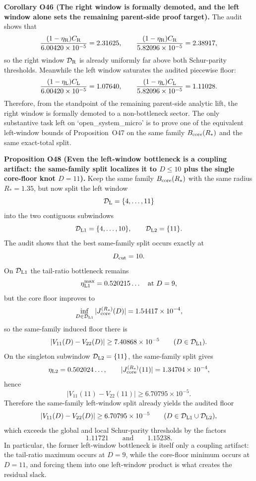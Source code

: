 \documentclass[aps,prd,onecolumn,notitlepage,nofootinbib,superscriptaddress,11pt,floatfix]{revtex4-2}
\begin{document}
\medskip\noindent\textbf{Corollary O46 (The right window is formally demoted, and the left window alone sets the remaining parent-side proof target).}
The audit
shows that
\[
\frac{(1-\eta_{\rm R})C_{\rm R}}{6.00420\times10^{-5}}=2.31625,
\qquad
\frac{(1-\eta_{\rm R})C_{\rm R}}{5.82096\times10^{-5}}=2.38917,
\]
so the right window \(\mathcal D_{\rm R}\) is already uniformly far above both Schur-parity thresholds.  Meanwhile the left window saturates the audited piecewise floor:
\[
\frac{(1-\eta_{\rm L})C_{\rm L}}{6.00420\times10^{-5}}=1.07640,
\qquad
\frac{(1-\eta_{\rm L})C_{\rm L}}{5.82096\times10^{-5}}=1.11028.
\]
Therefore, from the standpoint of the remaining parent-side analytic lift, the right window is formally demoted to a non-bottleneck sector.  The only substantive task left on `open\_system\_micro' is to prove one of the equivalent left-window bounds of Proposition~O47 on the same family \(B_{\rm core}(R_\ast)\) and the same exact-total split.

\medskip\noindent\textbf{Proposition O48 (Even the left-window bottleneck is a coupling artifact: the same-family split localizes it to \(D\le 10\) plus the single core-floor knot \(D=11\)).}
Keep the same family \(B_{\rm core}(R_\ast)\) with the same radius \(R_\ast=1.35\), but now split the left window
\[
\mathcal D_{\rm L}=\{4,\dots,11\}
\]
into the two contiguous subwindows
\[
\mathcal D_{\rm L1}=\{4,\dots,10\},
\qquad
\mathcal D_{\rm L2}=\{11\}.
\]
The audit
shows that the best same-family split occurs exactly at
\[
D_{\rm cut}=10.
\]
On \(\mathcal D_{\rm L1}\) the tail-ratio bottleneck remains
\[
\eta_{\rm L1}^{\max}=0.520215\ldots
\quad\text{at }D=9,
\]
but the core floor improves to
\[
\inf_{D\in\mathcal D_{\rm L1}}|J_{\rm core}^{(R_\ast)}(D)|
=
1.54417\times10^{-4},
\]
so the same-family induced floor there is
\[
|V_{11}(D)-V_{22}(D)|
\ge
7.40868\times10^{-5}
\qquad
(D\in\mathcal D_{\rm L1}).
\]
On the singleton subwindow \(\mathcal D_{\rm L2}=\{11\}\), the same-family split gives
\[
\eta_{\rm L2}=0.502024\ldots,
\qquad
|J_{\rm core}^{(R_\ast)}(11)|=1.34704\times10^{-4},
\]
hence
\[
|V_{11}(11)-V_{22}(11)|
\ge
6.70795\times10^{-5}.
\]
Therefore the same-family left-window split already yields the audited floor
\[
|V_{11}(D)-V_{22}(D)|
\ge
6.70795\times10^{-5}
\qquad
(D\in\mathcal D_{\rm L1}\cup\mathcal D_{\rm L2}),
\]
which exceeds the global and local Schur-parity thresholds by the factors
\[
1.11721
\qquad\text{and}\qquad
1.15238.
\]
In particular, the former left-window bottleneck is itself only a coupling artifact: the tail-ratio maximum occurs at \(D=9\), while the core-floor minimum occurs at \(D=11\), and forcing them into one left-window product is what creates the residual slack.
\end{document}
